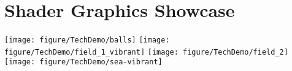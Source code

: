 \chapter{Shader Graphics Showcase}
\texttt{[image: figure/TechDemo/balls]}
\texttt{[image: figure/TechDemo/field\_1\_vibrant]}
\texttt{[image: figure/TechDemo/field\_2]}
\texttt{[image: figure/TechDemo/sea-vibrant]}